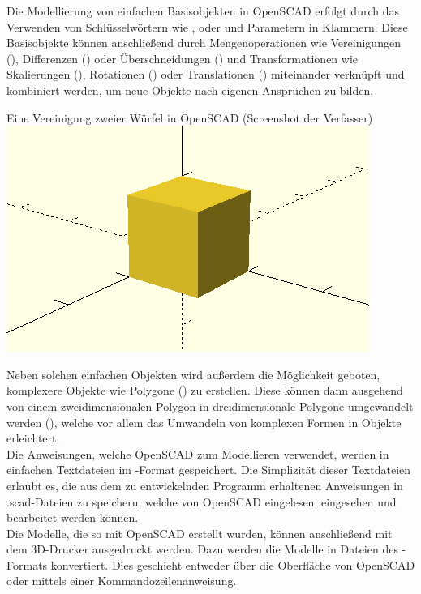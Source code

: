 Die Modellierung von einfachen Basisobjekten in OpenSCAD erfolgt durch das Verwenden von Schlüsselwörtern wie ,  oder  und Parametern in Klammern.
Diese Basisobjekte können anschließend durch Mengenoperationen wie Vereinigungen (), Differenzen () oder Überschneidungen () und Transformationen wie Skalierungen (), Rotationen () oder Translationen () miteinander verknüpft und kombiniert werden, um neue Objekte nach eigenen Ansprüchen zu bilden.

\begin{Bild}{Eine Vereinigung zweier Würfel in OpenSCAD (Screenshot der Verfasser)}
	\includegraphics{Bilder/OpenSCAD_Union}
\end{Bild}

Neben solchen einfachen Objekten wird außerdem die Möglichkeit geboten, komplexere Objekte wie Polygone () zu erstellen.
Diese können dann ausgehend von einem zweidimensionalen Polygon in dreidimensionale Polygone umgewandelt werden (), welche vor allem das Umwandeln von komplexen Formen in Objekte erleichtert. \\

Die Anweisungen, welche OpenSCAD zum Modellieren verwendet, werden in einfachen Textdateien im -Format gespeichert.
Die Simplizität dieser Textdateien erlaubt es, die aus dem zu entwickelnden Programm erhaltenen Anweisungen in .scad-Dateien zu speichern, welche von OpenSCAD eingelesen, eingesehen und bearbeitet werden können. \\

Die Modelle, die so mit OpenSCAD erstellt wurden, können anschließend mit dem 3D-Drucker ausgedruckt werden.
Dazu werden die Modelle in Dateien des -Formats konvertiert.
Dies geschieht entweder über die Oberfläche von OpenSCAD oder mittels einer Kommandozeilenanweisung.

